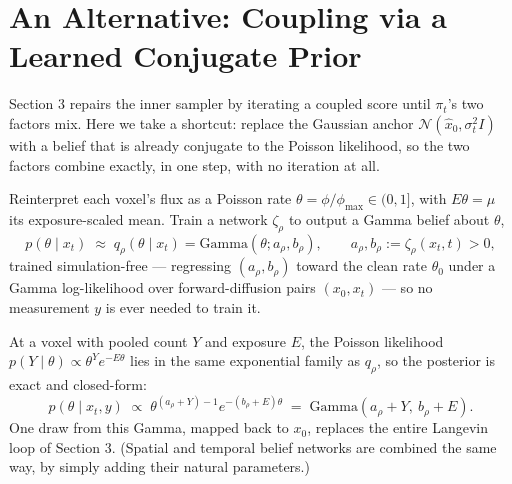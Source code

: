 \documentclass[11pt]{article}
\begin{document}
\section{An Alternative: Coupling via a Learned Conjugate Prior}

Section 3 repairs the inner sampler by iterating a coupled score until $\pi_t$'s two factors mix. Here we take a shortcut: replace the Gaussian anchor $\mathcal N(\hat x_0,\sigma_t^2 I)$ with a belief that is already conjugate to the Poisson likelihood, so the two factors combine exactly, in one step, with no iteration at all.

Reinterpret each voxel's flux as a Poisson rate $\theta=\phi/\phi_{\max}\in(0,1]$, with $E\theta=\mu$ its exposure-scaled mean. Train a network $\zeta_\rho$ to output a Gamma belief about $\theta$,
\[
p(\theta\mid x_t)\;\approx\;q_\rho(\theta\mid x_t)=\mathrm{Gamma}(\theta;a_\rho,b_\rho), \qquad a_\rho,b_\rho:=\zeta_\rho(x_t,t)>0,
\]
trained simulation-free — regressing $(a_\rho,b_\rho)$ toward the clean rate $\theta_0$ under a Gamma log-likelihood over forward-diffusion pairs $(x_0,x_t)$ — so no measurement $y$ is ever needed to train it.

At a voxel with pooled count $Y$ and exposure $E$, the Poisson likelihood $p(Y\mid\theta)\propto\theta^Ye^{-E\theta}$ lies in the same exponential family as $q_\rho$, so the posterior is exact and closed-form:
\[
p(\theta\mid x_t,y)\;\propto\;\theta^{(a_\rho+Y)-1}e^{-(b_\rho+E)\theta} \;=\; \mathrm{Gamma}(a_\rho+Y,\ b_\rho+E).
\]
One draw from this Gamma, mapped back to $x_0$, replaces the entire Langevin loop of Section 3. (Spatial and temporal belief networks are combined the same way, by simply adding their natural parameters.)
\end{document}
